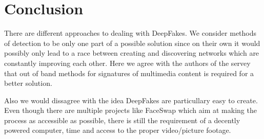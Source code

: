 \section{Conclusion}
There are different approaches to dealing with DeepFakes.
We consider methods of detection to be only one part of a possible solution since
on their own it would possibly only lead to a race between creating and discovering
networks which are constantly improving each other.
Here we agree with the authors of the servey that out of band methods for 
signatures of multimedia content is required for a better solution.

Also we would dissagree with the idea DeepFakes are particullary easy to create.
Even though there are multiple projects like FaceSwap which aim at making the
process as accessible as possible, there is still the requirement of a decently 
powered computer, time and access to the proper video/picture footage.